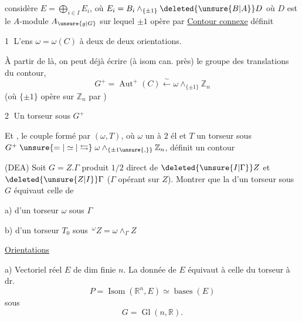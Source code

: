 considère $E=\bigoplus_{i\in I}E_i$, où $E_i=B_i\wedge_{\{\pm1\}}\deleted{\unsure{B|A}}D$ où $D$ est le $A$-module $A_{\unsure{g|G}}$ sur lequel $\pm1$ opère par 
\uline{Contour  connexe}  définit

\textcircled{1} L'ens $\omega=\omega(C)$ à deux  de  deux orientations.

À partir de là, on peut déjà écrire (à isom can. près) le groupe des translations du contour, 
\[
 G^+=\operatorname{Aut}^+(C)\xleftarrow{\sim}\omega\wedge_{\{\pm1\}}\mathbb Z_n
\]
(où $\{\pm1\}$ opère sur $\mathbb Z_n$ par )

\textcircled{2} Un torseur sous $G^+$

 Et , le couple formé par $(\omega,T)$, où $\omega$ un  à $2$ él et $T$ un torseur sous $G^+\mathrel{\unsure{=|\simeq|\leftrightarrows}}\omega\wedge_{\{\pm1\unsure{,}\}}\mathbb Z_n$, définit un
contour

\uline{} (DEA) Soit $G=Z.\Gamma$ produit $1/2$ direct de $\deleted{\unsure{I|\Gamma}}Z$ et $\deleted{\unsure{Z|I}}\Gamma$ ($\Gamma$ opérant sur $Z$). Montrer que la  d'un torseur  sous $G$ équivaut  celle de

a) d'un torseur $\omega$ sous $\Gamma$

b) d'un torseur $T_0$ sous $\,{}^\omega Z=\omega\wedge_\Gamma Z$

\uline{Orientations}

a) Vectoriel réel $E$ de dim finie $n$. La donnée de $E$ équivaut à celle du torseur à dr.
\[
 P=\operatorname{Isom}(\mathbb R^n,E)\simeq\operatorname{bases}(E)
\]
sous
\[
 G=\operatorname{Gl}(n,\mathbb R).
\]

